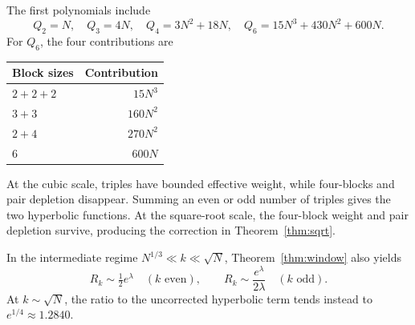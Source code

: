 \documentclass[11pt]{article}
\theoremstyle{definition}
\theoremstyle{remark}
\newcommand{\1}{\mathbf 1}
\begin{document}
The first polynomials include
\[
Q_2=N,\quad Q_3=4N,\quad Q_4=3N^2+18N,\quad
Q_6=15N^3+430N^2+600N.
\]
For $Q_6$, the four contributions are
\begin{center}
\begin{tabular}{lr}
\toprule
Block sizes & Contribution\\
\midrule
$2+2+2$ & $15N^3$\\
$3+3$ & $160N^2$\\
$2+4$ & $270N^2$\\
$6$ & $600N$\\
\bottomrule
\end{tabular}
\end{center}
At the cubic scale, triples have bounded effective weight, while four-blocks and pair depletion disappear. Summing an even or odd number of triples gives the two hyperbolic functions. At the square-root scale, the four-block weight and pair depletion survive, producing the correction in Theorem~\ref{thm:sqrt}.

In the intermediate regime $N^{1/3}\ll k\ll\sqrt N$, Theorem~\ref{thm:window} also yields
\[
R_k\sim\tfrac12e^\lambda\quad(k\text{ even}),\qquad
R_k\sim\frac{e^\lambda}{2\lambda}\quad(k\text{ odd}).
\]
At $k\sim\sqrt N$, the ratio to the uncorrected hyperbolic term tends instead to $e^{1/4}\approx1.2840$.
\end{document}
